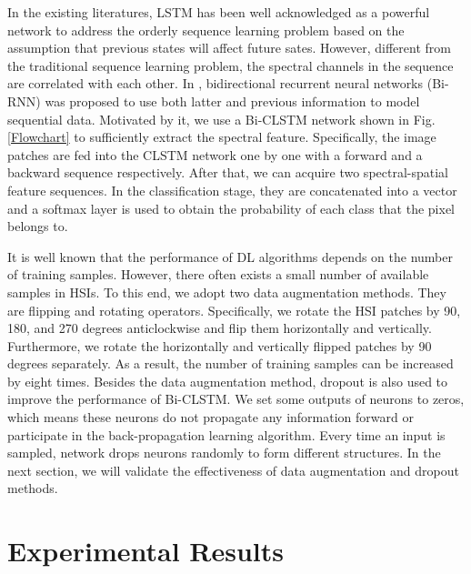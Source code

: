 \documentclass[12pt,onecolumn]{IEEEtran}
\begin{document}
\begin{spacing}{2}
In the existing literatures, LSTM has been well acknowledged as a powerful network to address the orderly sequence learning problem based on the assumption that previous states will affect future sates. However,
different from the traditional sequence learning problem, the spectral channels in the sequence are correlated with each other. In \cite{Schuster1997Bidirectional}, bidirectional recurrent neural networks (Bi-RNN) was proposed to use both latter and previous information to model sequential data. Motivated by it, we use a Bi-CLSTM network shown in Fig.$~$\ref{Flowchart} to sufficiently extract the spectral feature. Specifically, the image patches are fed into the CLSTM network one by one with a forward and a backward sequence respectively. After that, we can acquire two spectral-spatial feature sequences. In the classification stage, they are concatenated into a vector and a softmax layer is used to obtain the probability of each class that the pixel belongs to.

It is well known that the performance of DL algorithms depends on the number of training samples. However, there often exists a small number of available samples in HSIs. To this end, we adopt two data augmentation methods. They are flipping and rotating operators. Specifically, we rotate the HSI patches by 90, 180, and 270 degrees anticlockwise and flip them horizontally and vertically. Furthermore, we rotate the horizontally and vertically flipped patches by 90 degrees separately. As a result, the number of training samples can be increased by eight times. Besides the data augmentation method,
dropout \cite{Krizhevsky2012ImageNet} is also used to improve the performance of Bi-CLSTM. We set some outputs of neurons to zeros, which means these neurons do not propagate any information forward or participate in the back-propagation learning algorithm. Every time an input is sampled, network drops neurons randomly to form different structures. In the next section, we will validate the effectiveness of data augmentation and dropout methods.

\section{Experimental Results}

\end{spacing}
\end{document}
